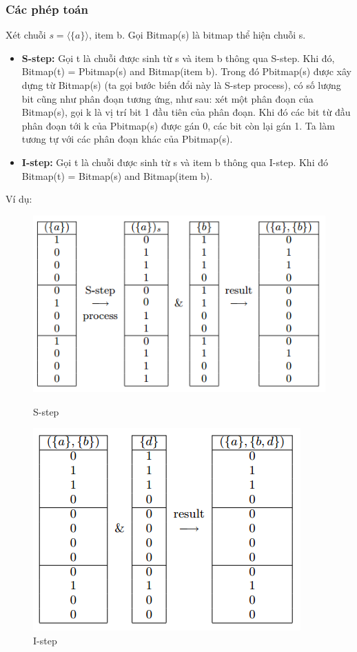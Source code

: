 \documentclass[a4paper 14pt]{article}
\begin{document}
			\subsubsection{Các phép toán}
				Xét chuỗi $s = \langle \{a\} \rangle$, item b. Gọi Bitmap(s) là bitmap thể hiện chuỗi s.\\
				\begin{itemize}
					\item \textbf{S-step:} Gọi t là chuỗi được sinh từ s và item b thông qua S-step. Khi đó, Bitmap(t) = Pbitmap(s) and Bitmap(item b). Trong đó Pbitmap(s) được xây dựng từ Bitmap(s) (ta gọi bước biến đổi này là S-step process), có số lượng bit cũng như phân đoạn tương ứng, như sau: xét một phân đoạn của Bitmap(s), gọi k là vị trí bit 1 đầu tiên của phân đoạn. Khi đó các bit từ đầu phân đoạn tới k của Pbitmap(s) được gán 0, các bit còn lại gán 1. Ta làm tương tự với các phân đoạn khác của Pbitmap(s). 
					\item \textbf{I-step:} Gọi t là chuỗi được sinh từ s và item b thông qua I-step. Khi đó Bitmap(t) = Bitmap(s) and Bitmap(item b).
				\end{itemize}
				Ví dụ:
				\begin{figure}[H]
					\begin{minipage}[t]{0.5\linewidth}
						\includegraphics[scale = 0.5]{Sstep}
						\caption{S-step}
					\end{minipage}%
					\begin{minipage}[t]{0.5\linewidth}
						\includegraphics[scale = 0.5]{Istep}
						\caption{I-step}
					\end{minipage}%
				\end{figure}
\end{document}
